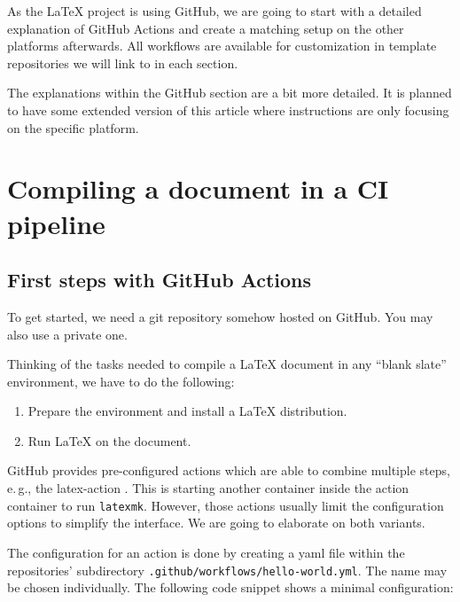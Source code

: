 \documentclass[final]{ltugboat}
\newcommand*{\setListingIcon}[1]{\def\listingIcon{#1}}
\newcommand*{\command}[1]{\texttt{#1}}
\newcommand*{\file}[1]{\texttt{#1}}
\begin{document}
As the \LaTeX{} project is using GitHub, we are going to start with a detailed explanation of GitHub Actions and create a matching setup on the other platforms afterwards.
All workflows are available for customization in template repositories we will link to in each section.

The explanations within the GitHub section are a bit more detailed.
It is planned to have some extended version of this article where instructions are only focusing on the specific platform.

\section{Compiling a document in a CI pipeline}

\subsection{First steps with GitHub Actions}
\setListingIcon{\GitHub}

To get started, we need a git repository somehow hosted on GitHub.
You may also use a private one.

Thinking of the tasks needed to compile a LaTeX document in any “blank slate” environment, we have to do the following:

\begin{enumerate}
\item Prepare the environment and install a \LaTeX{} distribution.
\item Run \LaTeX{} on the document.
\end{enumerate}
%
\noindent GitHub provides pre-configured actions which are able to combine multiple steps, e.\,g., the latex-action \cite{latex-action}.
This  is starting another container inside the action container to run \command{latexmk}.
However, those actions usually limit the configuration options to simplify the interface.
We are going to elaborate on both variants.

The configuration for an action is done by creating a yaml file within the repositories' subdirectory \file{.github/workflows/hello-world.yml}.
The name may be chosen individually.
The following code snippet shows a minimal configuration:

\inputminted{yaml}{examples/hello-world.yml}
\end{document}
